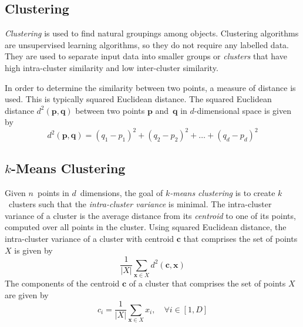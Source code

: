 \subsection{Clustering}

\emph{Clustering} is used to find natural groupings among objects.
Clustering algorithms are unsupervised learning algorithms, so they do not require any labelled data.
They are used to separate input data into smaller groups or \emph{clusters} that have high intra-cluster similarity and low inter-cluster similarity.

In order to determine the similarity between two points, a measure of distance is used.
This is typically squared Euclidean distance.
The squared Euclidean distance \( d^{2}\!\left( \boldsymbol{p}, \boldsymbol{q} \right) \) between two points \( \boldsymbol{p} \) and~\( \boldsymbol{q} \) in \( d \)-dimensional space is given by
\begin{equation*}
  d^{2}\!\left( \boldsymbol{p}, \boldsymbol{q} \right) = \left( q_{1} - p_{1} \right)^{2} + \left( q_{2} - p_{2} \right)^{2} + \ldots + \left( q_{d} - p_{d} \right)^{2}
\end{equation*}

\subsection{\texorpdfstring{\( k \)}{k}-Means Clustering}

Given \( n \)~points in \( d \)~dimensions, the goal of \emph{\( k \)-means clustering} is to create \( k \)~clusters such that the \emph{intra-cluster variance} is minimal.
The intra-cluster variance of a cluster is the average distance from its \emph{centroid} to one of its points, computed over all points in the cluster.
Using squared Euclidean distance, the intra-cluster variance of a cluster with centroid \( \boldsymbol{c} \) that comprises the set of points \( X \) is given by
\begin{equation*}
  \frac{1}{\left\lvert X \right\rvert} \sum_{\boldsymbol{x} \in X} d^{2}\!\left( \boldsymbol{c}, \boldsymbol{x} \right)
\end{equation*}
The components of the centroid \( \boldsymbol{c} \) of a cluster that comprises the set of points \( X \) are given by
\begin{equation*}
  c_{i} = \frac{1}{\left\lvert X \right\rvert} \sum_{\boldsymbol{x} \in X} x_{i}, \quad \forall i \in \left[ 1, D \right]
\end{equation*}

